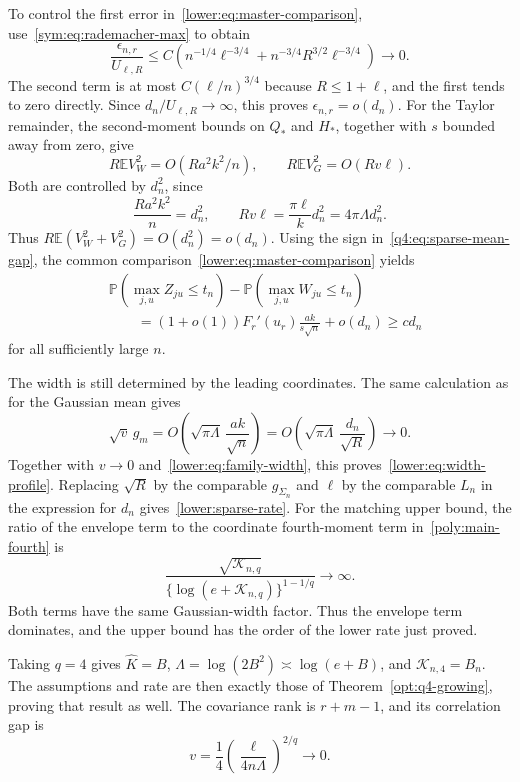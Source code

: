 \documentclass[11pt,letterpaper,twoside,leqno]{article}
\theoremstyle{bookplain}
\theoremstyle{bookremark}
\newcommand{\E}{\mathbb E}
\newcommand{\Pp}{\mathbb P}
\begin{document}
To control the first error in~\eqref{lower:eq:master-comparison},
use~\eqref{sym:eq:rademacher-max} to obtain
\[
 \frac{\epsilon_{n,r}}{U_{\ell,R}}
 \le C\left(n^{-1/4}\ell^{-3/4}
       +n^{-3/4}R^{3/2}\ell^{-3/4}\right)\to0.
\]
The second term is at most $C(\ell/n)^{3/4}$ because
$R\le1+\ell$, and the first tends to zero directly.
Since $d_n/U_{\ell,R}\to\infty$, this proves
$\epsilon_{n,r}=o(d_n)$.
For the Taylor remainder, the second-moment bounds on $Q_*$
and $H_*$, together with $s$ bounded away from zero, give
\[
 R\E V_W^2=O(Ra^2k^2/n),\qquad
 R\E V_G^2=O(Rv\ell).
\]
Both are controlled by $d_n^2$, since
\[
 \frac{Ra^2k^2}{n}=d_n^2,\qquad
 Rv\ell=\frac{\pi\ell}{k}d_n^2=4\pi\Lambda d_n^2.
\]
Thus $R\E(V_W^2+V_G^2)=O(d_n^2)=o(d_n)$.
Using the sign in~\eqref{q4:eq:sparse-mean-gap}, the common
comparison~\eqref{lower:eq:master-comparison} yields
\begin{equation}
\begin{split}
 &\Pp(\max_{j,u}Z_{ju}\le t_n)-\Pp(\max_{j,u}W_{ju}\le t_n)\\
 &\qquad=(1+o(1))F_r'(u_r)\frac{ak}{s\sqrt n}
           +o(d_n)\ge c d_n
\end{split}
 \label{q4:eq:sparse-orthant}
\end{equation}
for all sufficiently large $n$.

The width is still determined by the leading coordinates. The
same calculation as for the Gaussian mean gives
\[
 \sqrt v\,g_m
 =O\left(\sqrt{\pi\Lambda}\,\frac{ak}{\sqrt n}\right)
 =O\left(\sqrt{\pi\Lambda}\,\frac{d_n}{\sqrt R}\right)\to0.
\]
Together with $v\to0$ and~\eqref{lower:eq:family-width}, this
proves~\eqref{lower:eq:width-profile}. Replacing $\sqrt R$ by
the comparable $g_{\Sigma_n}$ and $\ell$ by the comparable
$L_n$ in the expression for $d_n$ gives~\eqref{lower:sparse-rate}.
For the matching upper bound, the ratio of the envelope term to
the coordinate fourth-moment term in~\eqref{poly:main-fourth} is
\[
 \frac{\sqrt{\mathcal K_{n,q}}}
 {\{\log(e+\mathcal K_{n,q})\}^{1-1/q}}\to\infty.
\]
Both terms have the same Gaussian-width factor. Thus the envelope
term dominates, and the upper bound has the order of the lower
rate just proved.

Taking $q=4$ gives $\widehat K=B$,
$\Lambda=\log(2B^2)\asymp\log(e+B)$, and
$\mathcal K_{n,4}=B_n$. The assumptions and rate are then
exactly those of Theorem~\ref{opt:q4-growing}, proving that
result as well. The covariance rank is $r+m-1$, and its
correlation gap is
\[
 v=\frac14\left(\frac{\ell}{4n\Lambda}\right)^{2/q}\to0.
\]
\end{document}
